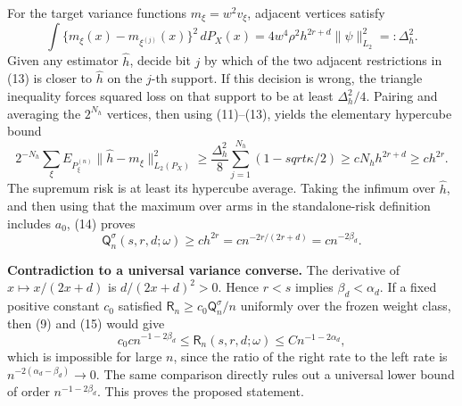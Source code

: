 For the target variance functions \(m_\xi=w^2v_\xi\), adjacent vertices satisfy
\[
\int\{m_\xi(x)-m_{\xi^{(j)}}(x)\}^2\,dP_X(x)
=4w^4\rho^2h^{2r+d}\|\psi\|_{L_2}^2
=:\Delta_h^2.
\tag{13}
\]
Given any estimator \(\widehat h\), decide bit \(j\) by which of the two adjacent restrictions in (13) is closer to \(\widehat h\) on the \(j\)-th support.  If this decision is wrong, the triangle inequality forces squared loss on that support to be at least \(\Delta_h^2/4\).  Pairing and averaging the \(2^{N_h}\) vertices, then using (11)--(13), yields the elementary hypercube bound
\[
2^{-N_h}\sum_\xi
E_{P_\xi^{(n)}}\|\widehat h-m_\xi\|_{L_2(P_X)}^2
\geq \frac{\Delta_h^2}{8}
\sum_{j=1}^{N_h}\left(1-sqrt{\kappa/2}\right)
\geq cN_hh^{2r+d}
\geq ch^{2r}.
\tag{14}
\]
The supremum risk is at least its hypercube average.  Taking the infimum over \(\widehat h\), and then using that the maximum over arms in the standalone-risk definition includes \(a_0\), (14) proves
\[
\mathsf Q_n^\sigma(s,r,d;\omega)
\geq c h^{2r}
=c n^{-2r/(2r+d)}
=c n^{-2\beta_d}.
\tag{15}
\]

\textbf{Contradiction to a universal variance converse.}
The derivative of \(x\mapsto x/(2x+d)\) is \(d/(2x+d)^2>0\).  Hence \(r<s\) implies \(\beta_d<\alpha_d\).  If a fixed positive constant \(c_0\) satisfied \(\mathsf R_n\geq c_0\mathsf Q_n^\sigma/n\) uniformly over the frozen weight class, then (9) and (15) would give
\[
c_0c n^{-1-2\beta_d}
\leq \mathsf R_n(s,r,d;\omega)
\leq Cn^{-1-2\alpha_d},
\]
which is impossible for large \(n\), since the ratio of the right rate to the left rate is \(n^{-2(\alpha_d-\beta_d)}\to0\).  The same comparison directly rules out a universal lower bound of order \(n^{-1-2\beta_d}\).  This proves the proposed statement.